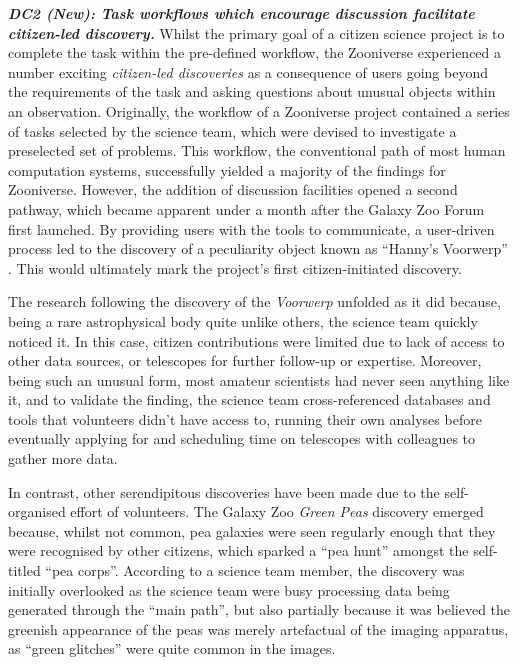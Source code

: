 \documentclass{sigchi}
\begin{document}
\begin{spacing}{0.97}
\textbf{\emph{DC2 (New): Task workflows which encourage discussion facilitate citizen-led discovery.}} Whilst the primary goal of a citizen science project is to complete the task within the pre-defined workflow, the Zooniverse experienced a number exciting \emph{citizen-led discoveries} as a consequence of users going beyond the requirements of the task and asking questions about unusual objects within an observation. Originally, the workflow of a Zooniverse project contained a series of tasks selected by the science team, which were devised to investigate a preselected set of problems. This workflow, the conventional path of most human computation systems, successfully yielded a majority of the findings for Zooniverse. However, the addition of discussion facilities opened a second pathway, which became apparent under a month after the Galaxy Zoo Forum first launched. By providing users with the tools to communicate, a user-driven process led to the discovery of a peculiarity object known as ``Hanny's Voorwerp'' \cite{lintott2009galaxy}. This would ultimately mark the project's first citizen-initiated discovery. 

The research following the discovery of the \emph{Voorwerp} unfolded as it did because, being a rare astrophysical body quite unlike others, the science team quickly noticed it. In this case, citizen contributions were limited due to lack of access to other data sources, or telescopes for further follow-up or expertise. Moreover, being such an unusual form, most amateur scientists had never seen anything like it, and to validate the finding, the science team cross-referenced databases and tools that volunteers didn't have access to, running their own analyses before eventually applying for and scheduling time on telescopes with colleagues to gather more data.

In contrast, other serendipitous discoveries have been made due to the self-organised effort of volunteers. The Galaxy Zoo \emph{Green Peas} \cite{cardamone2009galaxy,story-of-the-peas} discovery emerged because, whilst not common, pea galaxies were seen regularly enough that they were recognised by other citizens, which sparked a ``pea hunt'' amongst the self-titled ``pea corps''. According to a science team member, the discovery was initially overlooked as the science team were busy processing data being generated through the ``main path'', but also partially because it was believed the greenish appearance of the peas was merely artefactual of the imaging apparatus, as ``green glitches'' were quite common in the images. 


\end{spacing}
\end{document}
